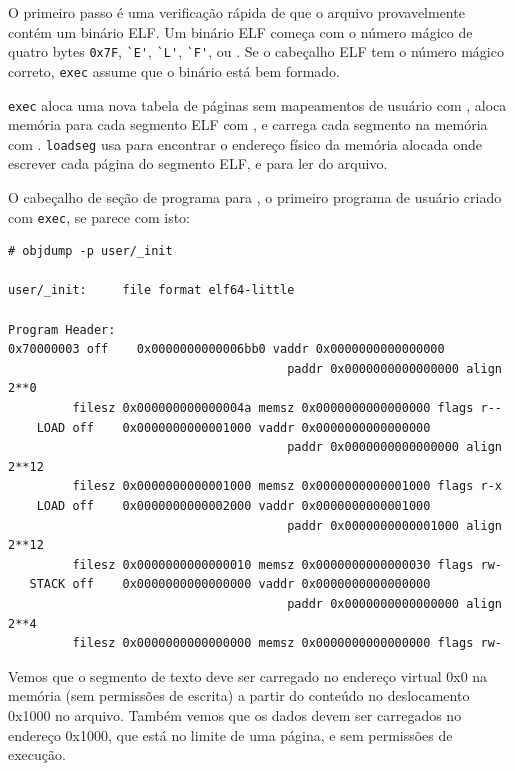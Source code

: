 O primeiro passo é uma verificação rápida de que o arquivo provavelmente contém um binário ELF.  
Um binário ELF começa com o número mágico de quatro bytes  
\lstinline{0x7F},  
\lstinline{`E'},  
\lstinline{`L'},  
\lstinline{`F'},  
ou  
.  
Se o cabeçalho ELF tem o número mágico correto,  
\lstinline{exec}  
assume que o binário está bem formado.

\lstinline{exec}  
aloca uma nova tabela de páginas sem mapeamentos de usuário com  
,  
aloca memória para cada segmento ELF com  
,  
e carrega cada segmento na memória com  
.  
\lstinline{loadseg}  
usa  
para encontrar o endereço físico da memória alocada onde escrever cada página do segmento ELF, e  
para ler do arquivo.

O cabeçalho de seção de programa para  
,  
o primeiro programa de usuário criado com  
\lstinline{exec},  
se parece com isto:
\begin{footnotesize}
\begin{verbatim}
# objdump -p user/_init

user/_init:     file format elf64-little

Program Header:
0x70000003 off    0x0000000000006bb0 vaddr 0x0000000000000000
                                       paddr 0x0000000000000000 align 2**0
         filesz 0x000000000000004a memsz 0x0000000000000000 flags r--
    LOAD off    0x0000000000001000 vaddr 0x0000000000000000
                                       paddr 0x0000000000000000 align 2**12
         filesz 0x0000000000001000 memsz 0x0000000000001000 flags r-x
    LOAD off    0x0000000000002000 vaddr 0x0000000000001000
                                       paddr 0x0000000000001000 align 2**12
         filesz 0x0000000000000010 memsz 0x0000000000000030 flags rw-
   STACK off    0x0000000000000000 vaddr 0x0000000000000000
                                       paddr 0x0000000000000000 align 2**4
         filesz 0x0000000000000000 memsz 0x0000000000000000 flags rw-
\end{verbatim}
\end{footnotesize}

Vemos que o segmento de texto deve ser carregado no endereço virtual 0x0 na memória (sem permissões de escrita) a partir do conteúdo no deslocamento 0x1000 no arquivo.  
Também vemos que os dados devem ser carregados no endereço 0x1000, que está no limite de uma página, e sem permissões de execução.

